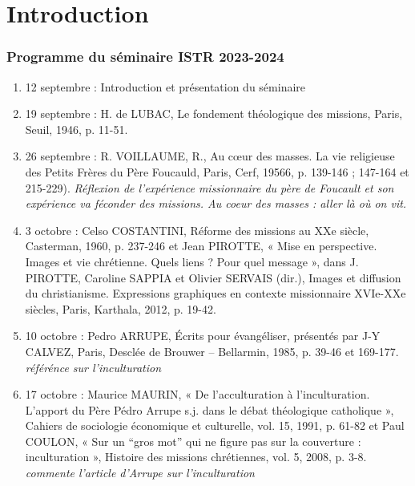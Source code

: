 \chapter{Introduction}

\subsection{Programme du séminaire ISTR 2023-2024}


\begin{enumerate}
    \item	12 septembre : Introduction et présentation du séminaire

    \item 	19 septembre : H. de LUBAC, Le fondement théologique des missions, Paris, Seuil, 1946, p. 11-51.

    \item 	26 septembre : R. VOILLAUME, R., Au cœur des masses. La vie religieuse des Petits Frères du Père Foucauld, Paris, Cerf, 19566, p. 139-146 ; 147-164 et 215-229). \textit{Réflexion de l'expérience missionnaire du père de Foucault et son expérience va féconder des missions. Au coeur des masses : aller là où on vit. }

    \item 	3 octobre : Celso COSTANTINI, Réforme des missions au XXe siècle, Casterman, 1960, p. 237-246 et Jean PIROTTE, « Mise en perspective. Images et vie chrétienne. Quels liens ? Pour quel message », dans J. PIROTTE, Caroline SAPPIA et Olivier SERVAIS (dir.), Images et diffusion du christianisme. Expressions graphiques en contexte missionnaire XVIe-XXe siècles, Paris, Karthala, 2012, p. 19-42. 

    \item 	10 octobre : Pedro ARRUPE, Écrits pour évangéliser, présentés par J-Y CALVEZ, Paris, Desclée de Brouwer – Bellarmin, 1985, p. 39-46 et 169-177. \textit{référénce sur l'inculturation}

    \item 	17 octobre : Maurice MAURIN, « De l’acculturation à l’inculturation. L’apport du Père Pédro Arrupe s.j. dans le débat théologique catholique », Cahiers de sociologie économique et culturelle, vol. 15, 1991, p. 61-82 et Paul COULON, « Sur un “gros mot” qui ne figure pas sur la couverture : inculturation », Histoire des missions chrétiennes, vol. 5, 2008, p. 3-8. \textit{commente l'article d'Arrupe sur l'inculturation}


\end{enumerate}
